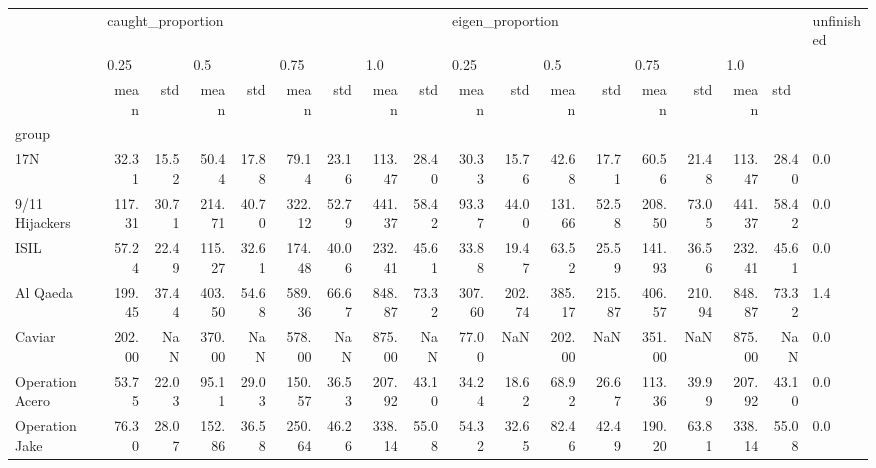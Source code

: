 \begin{tabular}{lrrrrrrrrrrrrrrrrl}
\toprule
{} & \multicolumn{8}{l}{caught\_proportion} & \multicolumn{8}{l}{eigen\_proportion} & unfinished \\
{} & \multicolumn{2}{l}{0.25} & \multicolumn{2}{l}{0.5} & \multicolumn{2}{l}{0.75} & \multicolumn{2}{l}{1.0} & \multicolumn{2}{l}{0.25} & \multicolumn{2}{l}{0.5} & \multicolumn{2}{l}{0.75} & \multicolumn{3}{l}{1.0} \\
{} &              mean &    std &    mean &    std &    mean &    std &    mean &    std &             mean &     std &    mean &     std &    mean &     std &    mean & \multicolumn{2}{l}{std} \\
group                &                   &        &         &        &         &        &         &        &                  &         &         &         &         &         &         &        &            \\
\midrule
17N                  &             32.31 &  15.52 &   50.44 &  17.88 &   79.14 &  23.16 &  113.47 &  28.40 &            30.33 &   15.76 &   42.68 &   17.71 &   60.56 &   21.48 &  113.47 &  28.40 &        0.0 \\
9/11 Hijackers       &            117.31 &  30.71 &  214.71 &  40.70 &  322.12 &  52.79 &  441.37 &  58.42 &            93.37 &   44.00 &  131.66 &   52.58 &  208.50 &   73.05 &  441.37 &  58.42 &        0.0 \\
ISIL                 &             57.24 &  22.49 &  115.27 &  32.61 &  174.48 &  40.06 &  232.41 &  45.61 &            33.88 &   19.47 &   63.52 &   25.59 &  141.93 &   36.56 &  232.41 &  45.61 &        0.0 \\
Al Qaeda             &            199.45 &  37.44 &  403.50 &  54.68 &  589.36 &  66.67 &  848.87 &  73.32 &           307.60 &  202.74 &  385.17 &  215.87 &  406.57 &  210.94 &  848.87 &  73.32 &        1.4 \\
Caviar               &            202.00 &    NaN &  370.00 &    NaN &  578.00 &    NaN &  875.00 &    NaN &            77.00 &     NaN &  202.00 &     NaN &  351.00 &     NaN &  875.00 &    NaN &        0.0 \\
Operation Acero      &             53.75 &  22.03 &   95.11 &  29.03 &  150.57 &  36.53 &  207.92 &  43.10 &            34.24 &   18.62 &   68.92 &   26.67 &  113.36 &   39.99 &  207.92 &  43.10 &        0.0 \\
Operation Jake       &             76.30 &  28.07 &  152.86 &  36.58 &  250.64 &  46.26 &  338.14 &  55.08 &            54.32 &   32.65 &   82.46 &   42.49 &  190.20 &   63.81 &  338.14 &  55.08 &        0.0 \\

\end{tabular}
